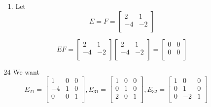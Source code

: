 \documentclass[12pt,letterpaper]{article}
\begin{document}
\begin{enumerate}
\begin{enumerate}
\begin{enumerate}[label=(\alph*)]
              \item

                Let
                \[
                  E = F =
                  \begin{bmatrix}
                    2  & 1 \\
                    -4 & -2 \\
                  \end{bmatrix}
                \]

                \[
                  EF
                  =
                  \begin{bmatrix}
                    2  & 1 \\
                    -4 & -2 \\
                  \end{bmatrix}
                  \begin{bmatrix}
                    2  & 1 \\
                    -4 & -2 \\
                  \end{bmatrix}
                  =
                  \begin{bmatrix}
                    0 & 0 \\
                    0 & 0 \\
                  \end{bmatrix}
                \]
          \end{enumerate}
        \item [24]
          We want
          \[
            E_{21}
            =
            \begin{bmatrix}
              1  & 0 & 0 \\
              -4 & 1 & 0 \\
              0  & 0 & 1 \\
            \end{bmatrix}
            ,
            E_{31}
            =
            \begin{bmatrix}
              1  & 0 & 0 \\
              0  & 1 & 0 \\
              2  & 0 & 1 \\
            \end{bmatrix}
            ,
            E_{32}
            =
            \begin{bmatrix}
              1  & 0  & 0 \\
              0  & 1  & 0 \\
              0  & -2 & 1 \\
            \end{bmatrix}
          \]


\end{enumerate}
\end{enumerate}
\end{document}
